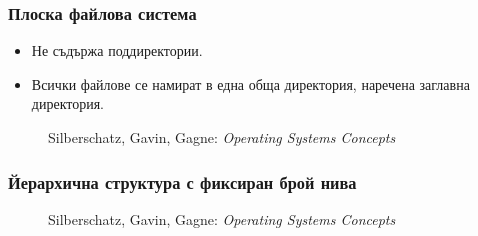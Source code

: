 \documentclass[ignorenonframetext, hyperref=unicode]{beamer}
\begin{document}
\begin{frame}
\frametitle{Плоска файлова система}
\begin{itemize}
  \item Не съдържа поддиректории. 
  \item Всички файлове се намират в една обща директория, наречена заглавна директория.
\end{itemize}
\begin{figure}[h]
\center
{}
\caption{Silberschatz, Gavin, Gagne: {\em Operating Systems Concepts}}
\end{figure}
\end{frame}

\begin{frame}
\frametitle{Йерархична структура с фиксиран брой нива}
\begin{figure}[h]
\center
{}
\caption{Silberschatz, Gavin, Gagne: {\em Operating Systems Concepts}}
\end{figure}
\end{frame}
\end{document}
